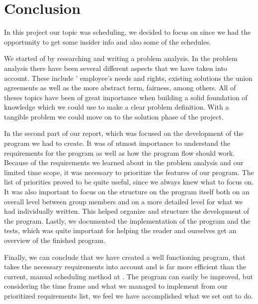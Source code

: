 \chapter*{Conclusion}
In this project our topic was scheduling, we decided to focus on \siemens since we had the opportunity to get some insider info and also some of the schedules. 

We started of by researching and writing a problem analysis. In the problem analysis there have been several different aspects that we have taken into account. These include \siemens' employee's needs and rights, existing solutions the union agreements as well as the more abstract term, fairness, among others. All of theses topics have been of great importance when building a solid foundation of knowledge which we could use to make a clear problem definition. With a tangible problem we could move on to the solution phase of the project.

In the second part of our report, which was focused on the development of the program we had to create. It was of utmost importance  to understand the requirements for the program as well as how the program flow should work. Because of the requirements we learned about in the problem analysis and our limited time scope, it was necessary to prioritize the features of our program. The list of priorities proved to be quite useful, since we always knew what to focus on.
It was also important to focus on the structure on the program itself both on an overall level between group members and on a more detailed level for what we had individually written. This helped organize and structure the development of the program.
Lastly, we documented the implementation of the program and the tests, which was quite important for helping the reader and ourselves get an overview of the finished program.

Finally, we can conclude that we have created a well functioning program, that takes the necessary requirements into account and is far more efficient than the current, manual scheduling method at \siemens. The program can easily be improved, but considering the time frame and what we managed to implement from our prioritized requirements list, we feel we have accomplished what we set out to do.
